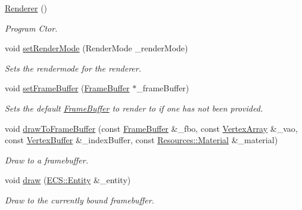 \begin{DoxyCompactItemize}
\item 
\hyperlink{class_cookie_eng_1_1_graphics_1_1_renderer_a255e78964e0d0ff7efd26e60a6612f39}{Renderer} ()
\begin{DoxyCompactList}\small\item\em Program Ctor. \end{DoxyCompactList}\item 
void \hyperlink{class_cookie_eng_1_1_graphics_1_1_renderer_afd0601318ff6155fbaa9af6a16cff079}{set\+Render\+Mode} (Render\+Mode \+\_\+render\+Mode)
\begin{DoxyCompactList}\small\item\em Sets the rendermode for the renderer. \end{DoxyCompactList}\item 
void \hyperlink{class_cookie_eng_1_1_graphics_1_1_renderer_a9e8bce3cb731b1f09ca5bc4bc863414b}{set\+Frame\+Buffer} (\hyperlink{class_cookie_eng_1_1_graphics_1_1_frame_buffer}{Frame\+Buffer} $\ast$\+\_\+frame\+Buffer)
\begin{DoxyCompactList}\small\item\em Sets the default \hyperlink{class_cookie_eng_1_1_graphics_1_1_frame_buffer}{Frame\+Buffer} to render to if one has not been provided. \end{DoxyCompactList}\item 
void \hyperlink{class_cookie_eng_1_1_graphics_1_1_renderer_aa32e62971f191a434ab457f9ac84ac31}{draw\+To\+Frame\+Buffer} (const \hyperlink{class_cookie_eng_1_1_graphics_1_1_frame_buffer}{Frame\+Buffer} \&\+\_\+fbo, const \hyperlink{class_cookie_eng_1_1_graphics_1_1_vertex_array}{Vertex\+Array} \&\+\_\+vao, const \hyperlink{class_cookie_eng_1_1_graphics_1_1_vertex_buffer}{Vertex\+Buffer} \&\+\_\+index\+Buffer, const \hyperlink{class_cookie_eng_1_1_resources_1_1_material}{Resources\+::\+Material} \&\+\_\+material)
\begin{DoxyCompactList}\small\item\em Draw to a framebuffer. \end{DoxyCompactList}\item 
void \hyperlink{class_cookie_eng_1_1_graphics_1_1_renderer_a5cadfbd80259f0188e52880c47ac7573}{draw} (\hyperlink{class_cookie_eng_1_1_e_c_s_1_1_entity}{E\+C\+S\+::\+Entity} \&\+\_\+entity)
\begin{DoxyCompactList}\small\item\em Draw to the currently bound framebuffer. \end{DoxyCompactList}\end{DoxyCompactItemize}
